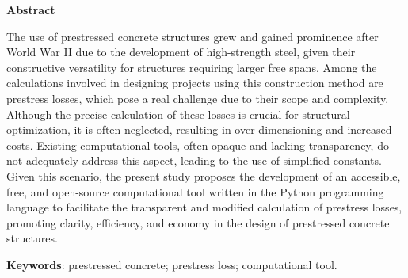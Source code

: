\begin{center}
    \textbf{Abstract}
\end{center}

\noindent The use of prestressed concrete structures grew and gained prominence after World War II due to the development of high-strength steel, given their constructive versatility for structures requiring larger free spans. Among the calculations involved in designing projects using this construction method are prestress losses, which pose a real challenge due to their scope and complexity. Although the precise calculation of these losses is crucial for structural optimization, it is often neglected, resulting in over-dimensioning and increased costs. Existing computational tools, often opaque and lacking transparency, do not adequately address this aspect, leading to the use of simplified constants. Given this scenario, the present study proposes the development of an accessible, free, and open-source computational tool written in the Python programming language to facilitate the transparent and modified calculation of prestress losses, promoting clarity, efficiency, and economy in the design of prestressed concrete structures.

\vspace{0.2cm}

\noindent\textbf{Keywords}: prestressed concrete; prestress loss; computational tool.